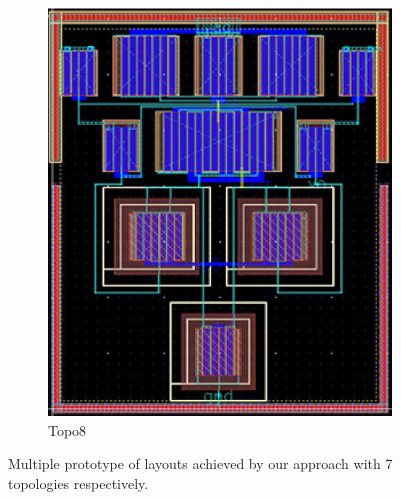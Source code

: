 \begin{figure}[ht]
\begin{subfigure}[t]{0.2\textwidth}
      \includegraphics[width=\textwidth]{Fig/MultTopo_Topo8.eps}
      \caption{Topo8}\label{fig:Topo8}
      \end{subfigure}
      \caption{Multiple prototype of layouts achieved by our approach with 7 topologies respectively.}
      \label{fig:MultTopo}
    \end{figure}

